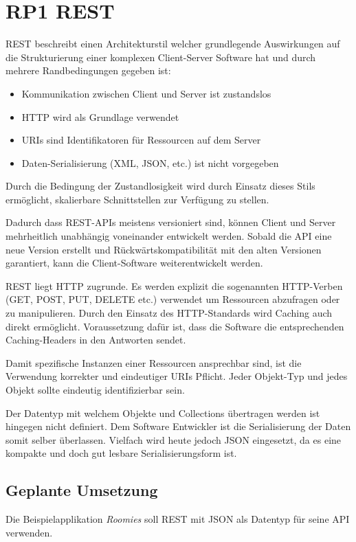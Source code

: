 \section{RP1 REST}
\label{sec:principle-rp1-rest}

\gls{REST} beschreibt einen Architekturstil welcher grundlegende Auswirkungen auf die Strukturierung einer komplexen Client-Server Software hat und durch mehrere Randbedingungen gegeben ist:
\begin{itemize}
	\item Kommunikation zwischen Client und Server ist zustandslos
	\item HTTP wird als Grundlage verwendet
	\item \glspl{URI} sind Identifikatoren für Ressourcen auf dem Server
	\item Daten-Serialisierung (XML, JSON, etc.) ist nicht vorgegeben
\end{itemize}

Durch die Bedingung der Zustandlosigkeit wird durch Einsatz dieses Stils ermöglicht, skalierbare Schnittstellen zur Verfügung zu stellen.

Dadurch dass REST-APIs meistens versioniert sind, können Client und Server mehrheitlich unabhängig voneinander entwickelt werden.
Sobald die API eine neue Version erstellt und Rückwärtskompatibilität mit den alten Versionen garantiert, kann die Client-Software weiterentwickelt werden.

REST liegt HTTP zugrunde. Es werden explizit die sogenannten HTTP-Verben (GET, POST, PUT, DELETE etc.) verwendet um Ressourcen abzufragen oder zu manipulieren.
Durch den Einsatz des HTTP-Standards wird Caching auch direkt ermöglicht. Voraussetzung dafür ist, dass die Software die entsprechenden Caching-Headers in den Antworten sendet.

Damit spezifische Instanzen einer Ressourcen ansprechbar sind, ist die Verwendung korrekter und eindeutiger \glspl{URI} Pflicht. Jeder Objekt-Typ und jedes Objekt sollte eindeutig identifizierbar sein.

Der Datentyp mit welchem Objekte und Collections übertragen werden ist hingegen nicht definiert. Dem Software Entwickler ist die Serialisierung der Daten somit selber überlassen.
Vielfach wird heute jedoch \gls{JSON} eingesetzt, da es eine kompakte und doch gut lesbare Serialisierungsform ist.

\subsection*{Geplante Umsetzung}
Die Beispielapplikation \emph{Roomies} soll REST mit JSON als Datentyp für seine API verwenden.

